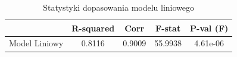 \begin{table}[H]
\caption{Statystyki dopasowania modelu liniowego}
\label{tab:zad4_lin_stats}
\begin{tabular}{lcccc}
\toprule
 & R-squared & Corr & F-stat & P-val (F) \\
\midrule
Model Liniowy & 0.8116 & 0.9009 & 55.9938 & 4.61e-06 \\
\bottomrule
\end{tabular}
\end{table}

